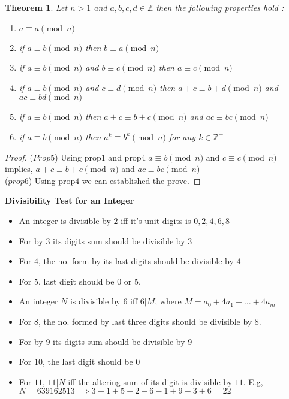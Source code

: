 \documentclass[12pt,a4paper]{article}
\newcommand{\Z}{\mathbb{Z}}
\newtheorem{thm}{Theorem}
\begin{document}
\begin{thm}\normalfont
	Let $n>1$ and $a,b,c,d \in \Z$ then the following properties hold :
	\begin{enumerate}
		\item $a \equiv a \pmod n$
		\item if  $a \equiv b \pmod n$ then  $b \equiv a \pmod n$
		\item if  $a \equiv b \pmod n$ and  $b \equiv c \pmod n$ then  $a \equiv c \pmod n$
		\item if  $a \equiv b \pmod n$ and  $c \equiv d \pmod n$ then  $a+c \equiv b+d \pmod n$ and  $ac \equiv bd \pmod n$
		\item  if $a \equiv b \pmod n$ then  $a+c \equiv b+c \pmod n$ and  $ac \equiv bc \pmod n$
		\item if  $a \equiv b \pmod n$ then  $a^{k} \equiv b^{k} \pmod n$ for any $k \in \Z^{+}$
	\end{enumerate}	
\end{thm}

\begin{proof}
	($Prop 5$) Using prop$1$ and prop$4$ $a \equiv b \pmod n$ and $ c \equiv c \pmod n$ implies, $a+c \equiv b+c \pmod n$ and $ac \equiv bc \pmod n$ \\
	($prop 6$) Using prop$4$ we can established the prove.
\end{proof}

\textbf{Divisibility Test for an Integer}
\begin{itemize}
	\item An integer is divisible by $2$ iff it's unit digits is $0,2,4,6,8$
	\item For by $3$ its digits sum should be divisible by $3$
	\item For $4$, the no. form by its last digits should be divisible by $4$
	\item For $5$, last digit should be $0$ or $5$.
	\item An integer $N$ is divisible by $6$ iff $6|M$, where $M = a_{0}+4a_{1}+\dots +4a_{m}$
	\item For $8$, the no. formed by last three digits should be divisible by $8$. 
	\item For by $9$ its digits sum should be divisible by $9$
	\item For $10$, the last digit should be $0$
	\item For $11$, $11|N$ iff the altering sum of its digit is divisible by $11$. E.g, $N=639162513 \implies 3-1+5-2+6-1+9-3+6=22$
\end{itemize}
\end{document}
